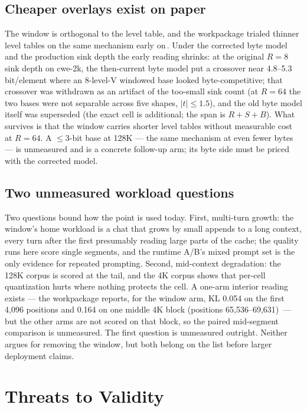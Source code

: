 \documentclass[10pt,twocolumn]{article}
\begin{document}
\subsection{Cheaper overlays exist on paper}

The window is orthogonal to the level table, and the workpackage trialed thinner level tables on the same mechanism early on\,\cite{strata-wp}. Under the corrected byte model and the production sink depth the early reading shrinks: at the original $R{=}8$ sink depth on cwe-2k, the then-current byte model put a crossover near 4.8--5.3 bit/element where an 8-level-V windowed base looked byte-competitive; that crossover was withdrawn as an artifact of the too-small sink count (at $R{=}64$ the two bases were not separable across five shapes, $|t| \le 1.5$), and the old byte model itself was superseded (the exact cell is additional; the span is $R{+}S{+}B$). What survives is that the window carries shorter level tables without measurable cost at $R{=}64$. A $\leq$3-bit base at 128K --- the same mechanism at even fewer bytes --- is unmeasured and is a concrete follow-up arm; its byte side must be priced with the corrected model.

\subsection{Two unmeasured workload questions}

Two questions bound how the point is used today. First, multi-turn growth: the window's home workload is a chat that grows by small appends to a long context, every turn after the first presumably reading large parts of the cache; the quality runs here score single segments, and the runtime A/B's mixed prompt set is the only evidence for repeated prompting. Second, mid-context degradation: the 128K corpus is scored at the tail, and the 4K corpus shows that per-cell quantization hurts where nothing protects the cell. A one-arm interior reading exists --- the workpackage reports, for the window arm, KL 0.054 on the first 4,096 positions and 0.164 on one middle 4K block (positions 65,536--69,631)\,\cite{strata-wp} --- but the other arms are not scored on that block, so the paired mid-segment comparison is unmeasured. The first question is unmeasured outright. Neither argues for removing the window, but both belong on the list before larger deployment claims.

\section{Threats to Validity}
\end{document}
